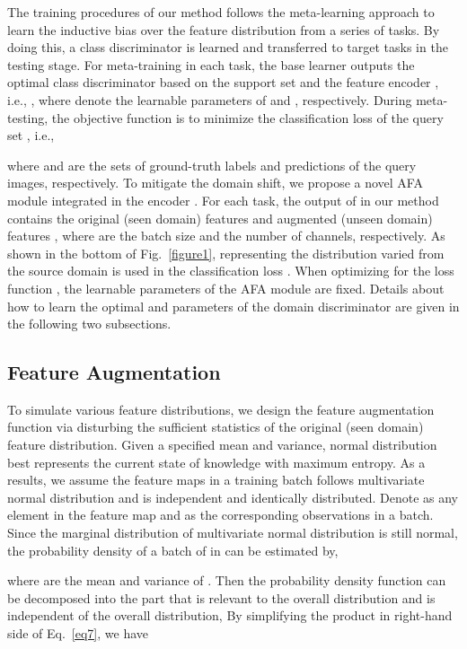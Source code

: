 \documentclass[runningheads]{utils/llncs}
\begin{document}
The training procedures of our method follows the meta-learning approach to learn the inductive bias over the feature distribution from a series of tasks. 
By doing this, a class discriminator  is learned and transferred to target tasks in the testing stage. 
For meta-training in each task, the base learner  outputs the optimal class discriminator  based on the support set  and the feature encoder , i.e., , where  denote the learnable parameters of  and , respectively.
During meta-testing, the objective function is to minimize the classification loss of the query set , i.e.,

where  and  are the sets of ground-truth labels and predictions of the query images, respectively.
To mitigate the domain shift, we propose a novel AFA module integrated in the encoder .
For each task, the output of  in our method contains the original (seen domain) features  and augmented (unseen domain) features , where  are the batch size and the number of channels, respectively. 
As shown in the bottom of Fig.~\ref{figure1},  representing the distribution varied from the source domain is used in the classification loss .
When optimizing for the loss function , the learnable parameters of the AFA module  are fixed.
Details about how to learn the optimal  and parameters  of the domain discriminator  are given in the following two subsections.






\subsection{Feature Augmentation}
To simulate various feature distributions, we design the feature augmentation function via disturbing the sufficient statistics of the original (seen domain) feature distribution.
Given a specified mean and variance, normal distribution best represents the current state of knowledge with maximum entropy.
As a results, we assume the feature maps in a training batch follows multivariate normal distribution and is independent and identically distributed.
Denote  as any element in the feature map and  as the corresponding observations in a batch.
Since the marginal distribution of multivariate normal distribution is still normal, the probability density of a batch of  in can be estimated by, 

where  are the mean and variance of .
Then the probability density function can be decomposed into the part that is relevant to the overall distribution and is independent of the overall distribution,
By simplifying the product in right-hand side of Eq.~\eqref{eq7}, we have
\end{document}

